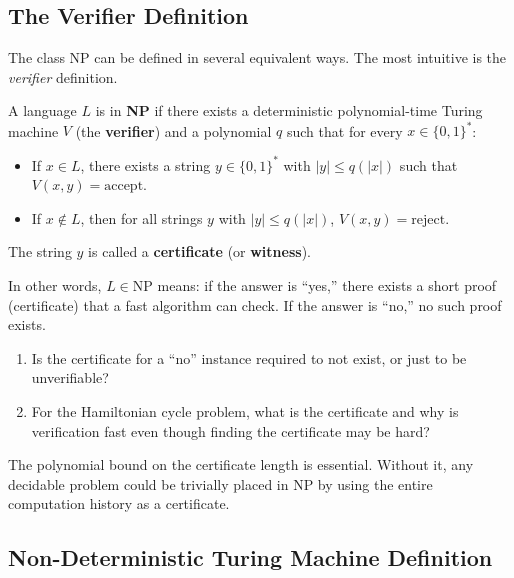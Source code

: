 \subsection{The Verifier Definition}

The class NP can be defined in several equivalent ways. The most intuitive is the \emph{verifier} definition.

\begin{definition}
A language $L$ is in \textbf{NP} if there exists a deterministic polynomial-time Turing machine $V$ (the \textbf{verifier}) and a polynomial $q$ such that for every $x \in \{0,1\}^*$:
\begin{itemize}
  \item If $x \in L$, there exists a string $y \in \{0,1\}^{*}$ with $|y| \leq q(|x|)$ such that $V(x, y) = \text{accept}$.
  \item If $x \notin L$, then for all strings $y$ with $|y| \leq q(|x|)$, $V(x, y) = \text{reject}$.
\end{itemize}
The string $y$ is called a \textbf{certificate} (or \textbf{witness}).
\end{definition}

In other words, $L \in \text{NP}$ means: if the answer is ``yes,'' there exists a short proof (certificate) that a fast algorithm can check. If the answer is ``no,'' no such proof exists.

\begin{checkyou}
\begin{enumerate}
  \item Is the certificate for a ``no'' instance required to not exist, or just to be unverifiable?
  \item For the Hamiltonian cycle problem, what is the certificate and why is verification fast even though finding the certificate may be hard?
\end{enumerate}
\end{checkyou}

\begin{remark}
The polynomial bound on the certificate length is essential. Without it, any decidable problem could be trivially placed in NP by using the entire computation history as a certificate.
\end{remark}

\subsection{Non-Deterministic Turing Machine Definition}

